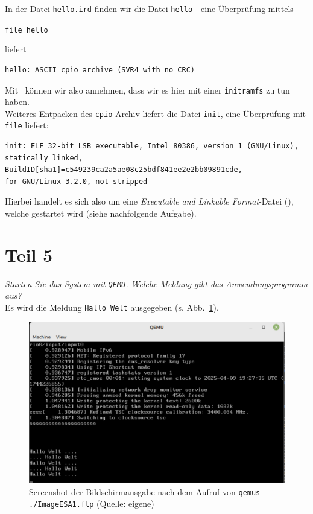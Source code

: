 \noindent
In der Datei \texttt{hello.ird} finden wir die Datei \texttt{hello} - eine Überprüfung mittels

\begin{center}
    \texttt{file hello}
\end{center}

\noindent
liefert

\begin{verbatim}
hello: ASCII cpio archive (SVR4 with no CRC)
\end{verbatim}

\noindent
Mit~\cite[117 f.]{ES4} können wir also annehmen, dass wir es hier mit einer \texttt{initramfs} zu tun haben.\\
Weiteres Entpacken des \texttt{cpio}-Archiv liefert die Datei \texttt{init}, eine Überprüfung mit \texttt{file} liefert:

\begin{verbatim}
init: ELF 32-bit LSB executable, Intel 80386, version 1 (GNU/Linux),
statically linked, BuildID[sha1]=c549239ca2a5ae08c25bdf841ee2e2bb09891cde,
for GNU/Linux 3.2.0, not stripped
\end{verbatim}

\noindent
Hierbei handelt es sich also um eine \textit{Executable and Linkable Format}-Datei (\cite[24]{ES4}), welche gestartet wird (siehe nachfolgende Aufgabe).

\section{Teil 5}

\textit{Starten Sie das System mit \texttt{QEMU}. Welche Meldung gibt das Anwendungsprogramm aus?}\\

\noindent
Es wird die Meldung \texttt{Hallo Welt} ausgegeben (s. Abb.~\ref{fig:qemus}).

\begin{figure}
\centering
\includegraphics[scale=0.3]{aufgabe 1/img/qemus}
\caption{Screenshot der Bildschirmausgabe nach dem Aufruf von \texttt{qemus ./ImageESA1.flp}  (Quelle: eigene)}
\label{fig:qemus}
\end{figure}

